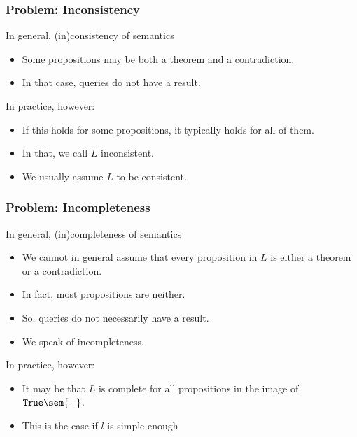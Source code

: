 \begin{frame}\frametitle{Problem: Inconsistency}
In general, (in)consistency of semantics
\begin{itemize}
\item Some propositions may be both a theorem and a contradiction.
\item In that case, queries do not have a result.
\end{itemize}

In practice, however:
\begin{itemize}
\item If this holds for some propositions, it typically holds for all of them.
\item In that, we call $L$ inconsistent.
\item We usually assume $L$ to be consistent.
\end{itemize}
\end{frame}


\begin{frame}\frametitle{Problem: Incompleteness}
In general, (in)completeness of semantics
\begin{itemize}
\item We cannot in general assume that every proposition in $L$ is either a theorem or a contradiction.
\item In fact, most propositions are neither.
\item So, queries do not necessarily have a result.
\item We speak of incompleteness. 
\end{itemize}

In practice, however:
\begin{itemize}
\item It may be that $L$ is complete for all propositions in the image of $\truelift\sem{-}$.
\item This is the case if $l$ is simple enough 
\end{itemize}
\end{frame}

